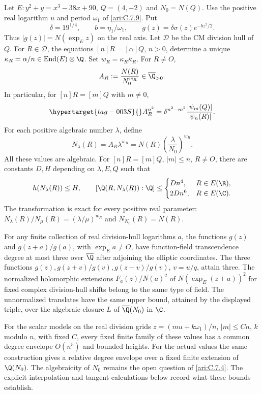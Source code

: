 \begin{proposition}\hypertarget{tag-001A}{}\label{ari:C.7.12}

Let $E:y^2+y=x^3-38x+90$, $Q=(4,-2)$ and $N_0=N(Q)$.
Use the positive real logarithm $u$ and period $\omega_1$ of
\ref{ari:C.7.9}. Put
\[
 \delta=19^{1/4},\qquad b=\eta_1/\omega_1,\qquad
 g(z)=\delta\sigma(z)e^{-bz^2/2}.
\]
Thus $|g(z)|=N(\exp_Ez)$ on the real axis. Let $\mathcal D$
be the CM division hull of $Q$. For $R\in\mathcal D$, the
equations $[n]R=[\alpha]Q$, $n>0$, determine a unique
$\kappa_R=\alpha/n\in\operatorname{End}(E)\otimes\Q$.
Set $w_R=\kappa_R\bar\kappa_R$. For $R\ne O$,
\[
 A_R:=\frac{N(R)}{N_0^{w_R}}\in\overline\Q_{>0}.
\]
In particular, for $[n]R=[m]Q$ with $m\ne0$,
\begin{equation}\hypertarget{tag-003S}{}\label{ari:eq:division-ratio-model}
 A_R^{n^2}=\delta^{n^2-m^2}
                  \frac{|\psi_m(Q)|}{|\psi_n(R)|}.
\end{equation}
For each positive algebraic number $\lambda$, define
\[
 N_\lambda(R)=A_R\lambda^{w_R}
       =N(R)\left(\frac{\lambda}{N_0}\right)^{w_R}.
\]
All these values are algebraic. For $[n]R=[m]Q$, $|m|\le n$,
$R\ne O$, there are constants $D,H$ depending on $\lambda,E,Q$
such that
\[
 h(N_\lambda(R))\le H,\qquad
 [\Q(R,N_\lambda(R)):\Q]\le
 \begin{cases}Dn^4,&R\in E(\R),\\2Dn^6,&R\in E(\C).
 \end{cases}
\]
The transformation is exact for every positive real parameter:
$N_\lambda(R)/N_\mu(R)=(\lambda/\mu)^{w_R}$ and
$N_{N_0}(R)=N(R)$.

For any finite collection of real division-hull logarithms $a$,
the functions $g(z)$ and $g(z+a)/g(a)$, with $\exp_Ea\ne O$,
have function-field transcendence degree at most three over
$\overline\Q$ after adjoining the elliptic coordinates.
The three functions $g(z),g(z+v)/g(v),g(z-v)/g(v)$, $v=u/q$,
attain three. The normalized holomorphic extensions
$F_a(z)/N(a)^2$ of $N(\exp_E(z+a))^2$ for fixed complex
division-hull shifts belong to the same type of field.
The unnormalized translates have the same upper bound, attained by
the displayed triple, over the algebraic closure $L$ of $\overline\Q(N_0)$ in $\C$.

For the scalar models on the real division grids
$z=(mu+k\omega_1)/n$, $|m|\le Cn$, $k$ modulo $n$, with
fixed $C$, every fixed finite family of these values has a common
degree envelope $O(n^5)$ and bounded heights. For the actual values the same construction
gives a relative degree envelope over a fixed finite extension
of $\Q(N_0)$. The algebraicity of $N_0$ remains the open question
of \ref{ari:C.7.4}. The explicit interpolation and tangent
calculations below record what these bounds establish.
\end{proposition}

